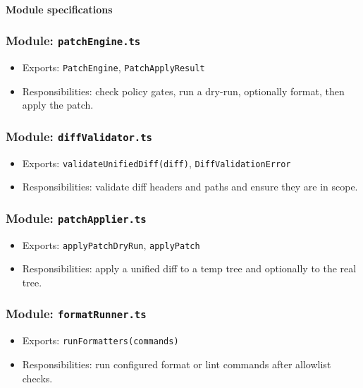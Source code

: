 \documentclass[11pt]{article}
\begin{document}
\paragraph{Module specifications}
\subsubsection*{Module: \texttt{patchEngine.ts}}
\begin{itemize}[noitemsep]
  \item Exports: \texttt{PatchEngine}, \texttt{PatchApplyResult}
  \item Responsibilities: check policy gates, run a dry-run, optionally format, then apply the patch.
\end{itemize}

\subsubsection*{Module: \texttt{diffValidator.ts}}
\begin{itemize}[noitemsep]
  \item Exports: \texttt{validateUnifiedDiff(diff)}, \texttt{DiffValidationError}
  \item Responsibilities: validate diff headers and paths and ensure they are in scope.
\end{itemize}

\subsubsection*{Module: \texttt{patchApplier.ts}}
\begin{itemize}[noitemsep]
  \item Exports: \texttt{applyPatchDryRun}, \texttt{applyPatch}
  \item Responsibilities: apply a unified diff to a temp tree and optionally to the real tree.
\end{itemize}

\subsubsection*{Module: \texttt{formatRunner.ts}}
\begin{itemize}[noitemsep]
  \item Exports: \texttt{runFormatters(commands)}
  \item Responsibilities: run configured format or lint commands after allowlist checks.
\end{itemize}
\end{document}
